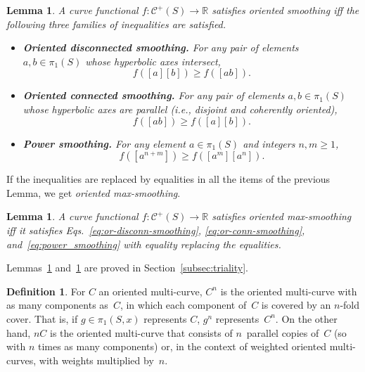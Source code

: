 \documentclass[11pt]{amsart}
\numberwithin{equation}{section}
\numberwithin{figure}{section}
\newtheorem{lemma}[theorem]{Lemma}
\theoremstyle{definition}
\newtheorem{definition}[theorem]{Definition}
\theoremstyle{plain}
\newcommand{\Curves}{\mathcal{C}}
\begin{document}
\begin{lemma}
  A curve functional $f \colon \Curves^+(S) \to \mathbb{R}$ satisfies
  oriented smoothing iff the following three families of
  inequalities  are satisfied.
\begin{itemize}

\item \textbf{Oriented disconnected smoothing.}
For any pair of elements $a,b \in \pi_1(S)$ whose hyperbolic axes intersect,
\begin{equation}\label{eq:or-disconn-smoothing}
f([a][b]) \ge f([ab]).
\end{equation}
\item \textbf{Oriented connected smoothing.}
For any pair of elements $a,b \in \pi_1(S)$ whose hyperbolic axes are parallel
(i.e., disjoint and coherently oriented),
\begin{equation}\label{eq:or-conn-smoothing}
f([ab]) \ge f([a][b]).
\end{equation}
\item \textbf{Power smoothing.}
For any element $a \in \pi_1(S)$ and integers $n,m \ge 1$,
\begin{equation}
f([a^{n+m}]) \ge f([a^m][a^n]).
\label{eq:power_smoothing}
\end{equation}

\end{itemize}
\label{lem:oriented_smoothing_lemma_top_alg}
\end{lemma}

If the inequalities are replaced by equalities in all the items of the previous Lemma, we get \emph{oriented max-smoothing}.

\begin{lemma}
  A curve functional $f \colon \Curves^+(S) \to \mathbb{R}$ satisfies
  oriented max-smoothing iff it satisfies
  Eqs.~\eqref{eq:or-disconn-smoothing}, \eqref{eq:or-conn-smoothing},
  and~\eqref{eq:power_smoothing} with equality replacing the equalities.
\label{lem:orientedmax_smoothing_lemma_top_alg}
\end{lemma}

Lemmas~\ref{lem:oriented_smoothing_lemma_top_alg}
and~\ref{lem:orientedmax_smoothing_lemma_top_alg} are proved in
Section~\ref{subsec:triality}.

\begin{definition}
  For $C$ an oriented multi-curve,  $C^n$ is the oriented multi-curve with as many components as~$C$, in which each
  component of~$C$ is covered by an $n$-fold cover. That is, if
  $g \in \pi_1(S,x)$ represents $C$, $g^n$
  represents~$C^n$.
  On the other hand, $nC$ is the oriented multi-curve
  that consists of $n$~parallel
  copies of~$C$ (so with $n$ times as many components) or,
  in the context of weighted oriented multi-curves,
  with weights multiplied by~$n$.
\end{definition}
\end{document}
